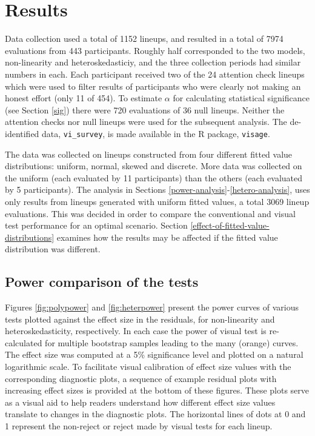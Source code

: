 \documentclass[]{interact}
\theoremstyle{plain}%
\theoremstyle{definition}
\theoremstyle{remark}
\begin{document}
\hypertarget{results}{%
\section{Results}\label{results}}

Data collection used a total of 1152 lineups, and resulted in a total of
7974 evaluations from 443 participants. Roughly half corresponded to the
two models, non-linearity and heteroskedasticiy, and the three
collection periods had similar numbers in each. Each participant
received two of the 24 attention check lineups which were used to filter
results of participants who were clearly not making an honest effort
(only 11 of 454). To estimate \(\alpha\) for calculating statistical
significance (see Section \ref{sig}) there were 720 evaluations of 36
null lineups. Neither the attention checks nor null lineups were used
for the subsequent analysis. The de-identified data,
\texttt{vi\_survey}, is made available in the R package,
\texttt{visage}.

The data was collected on lineups constructed from four different fitted
value distributions: uniform, normal, skewed and discrete. More data was
collected on the uniform (each evaluated by 11 participants) than the
others (each evaluated by 5 participants). The analysis in Sections
\ref{power-analysis}-\ref{hetero-analysis}, uses only results from
lineups generated with uniform fitted values, a total 3069 lineup
evaluations. This was decided in order to compare the conventional and
visual test performance for an optimal scenario. Section
\ref{effect-of-fitted-value-distributions} examines how the results may
be affected if the fitted value distribution was different.

\hypertarget{power-comparison-of-the-tests}{%
\subsection{\texorpdfstring{Power comparison of the
tests\label{power-analysis}}{Power comparison of the tests}}\label{power-comparison-of-the-tests}}

Figures \ref{fig:polypower} and \ref{fig:heterpower} present the power
curves of various tests plotted against the effect size in the
residuals, for non-linearity and heteroskedasticity, respectively. In
each case the power of visual test is re-calculated for multiple
bootstrap samples leading to the many (orange) curves. The effect size
was computed at a 5\% significance level and plotted on a natural
logarithmic scale. To facilitate visual calibration of effect size
values with the corresponding diagnostic plots, a sequence of example
residual plots with increasing effect sizes is provided at the bottom of
these figures. These plots serve as a visual aid to help readers
understand how different effect size values translate to changes in the
diagnostic plots. The horizontal lines of dots at 0 and 1 represent the
non-reject or reject made by visual tests for each lineup.
\end{document}
